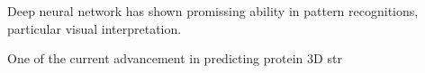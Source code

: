Deep neural network has shown promissing ability in pattern recognitions, particular visual interpretation.
\par 

One of the current advancement in predicting protein 3D str